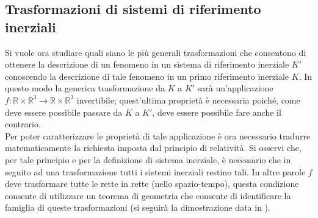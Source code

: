 \subsection{Trasformazioni di sistemi di riferimento inerziali}
Si vuole ora studiare quali siano le più generali trasformazioni che consentono di ottenere la descrizione di un fenomeno in un sistema di riferimento inerziale $K'$ conoscendo la descrizione di tale fenomeno in un primo riferimento inerziale $K$. In questo modo la generica trasformazione da $K$ a $K'$ sarà un'applicazione $f:\mathbb{R}\times \mathbb{R}^3\rightarrow\mathbb{R}\times \mathbb{R}^3$ invertibile; quest'ultima proprietà è necessaria poiché, come deve essere possibile passare da $K$ a $K'$, deve essere possibile fare anche il contrario.\\
Per poter caratterizzare le proprietà di tale applicazione è ora necessario tradurre matematicamente la richiesta imposta dal principio di relatività. Si osservi che, per tale principio e per la definizione di sistema inerziale, è necessario che in seguito ad una trasformazione tutti i sistemi inerziali restino tali. In altre parole $f$ deve trasformare tutte le rette in rette (nello spazio-tempo), questa condizione consente di utilizzare un teorema di geometria che consente di identificare la famiglia di queste trasformazioni (si seguirà la dimostrazione data in \cite{LostThmOfGeometry}). 

